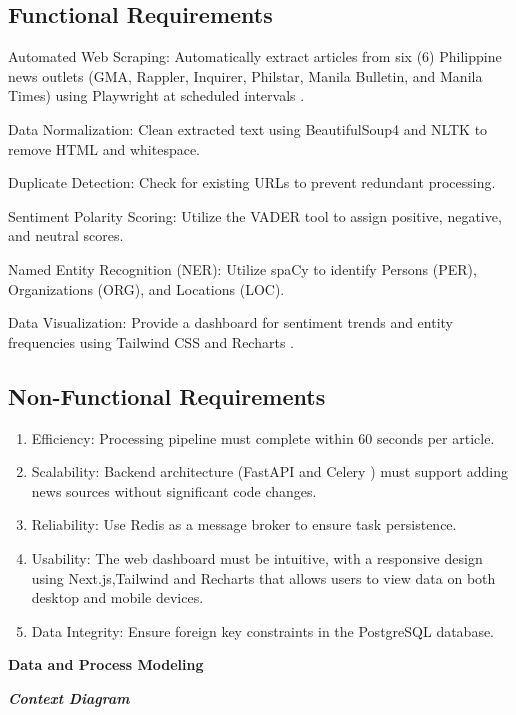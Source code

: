 \subsection{Functional Requirements}
Automated Web Scraping: Automatically extract articles from six (6) Philippine news outlets (GMA, Rappler, Inquirer, Philstar, Manila Bulletin, and Manila Times) using Playwright \cite{ref30}at scheduled intervals \cite{ref15,ref29}.

Data Normalization: Clean extracted text using BeautifulSoup4 and NLTK \cite{ref39,ref01} to remove HTML and whitespace.

Duplicate Detection: Check for existing URLs to prevent redundant processing.

Sentiment Polarity Scoring: Utilize the VADER \cite{ref08} tool to assign positive, negative, and neutral scores.

Named Entity Recognition (NER): Utilize spaCy \cite{ref26} to identify Persons (PER), Organizations (ORG), and Locations (LOC).

Data Visualization: Provide a dashboard for sentiment trends and entity frequencies using Tailwind CSS and Recharts \cite{ref34,ref33}.

\subsection{Non-Functional Requirements}
\begin{enumerate}
\def\labelenumi{\arabic{enumi}.}
\item
  Efficiency: Processing pipeline must complete within 60 seconds per article.
\item
  Scalability: Backend architecture (FastAPI \cite{ref27} and Celery \cite{ref29}) must support adding news sources without significant code changes.
\item
  Reliability: Use Redis \cite{ref15} as a message broker to ensure task persistence.
\item
  Usability: The web dashboard must be intuitive, with a responsive design using Next.js,Tailwind and Recharts \cite{ref32,ref33,ref34} that allows users to view data on both desktop and mobile devices.
\item
  Data Integrity: Ensure foreign key constraints in the PostgreSQL \cite{ref06} database.
\end{enumerate}

\textbf{Data and Process Modeling}

\emph{\textbf{Context Diagram}}

